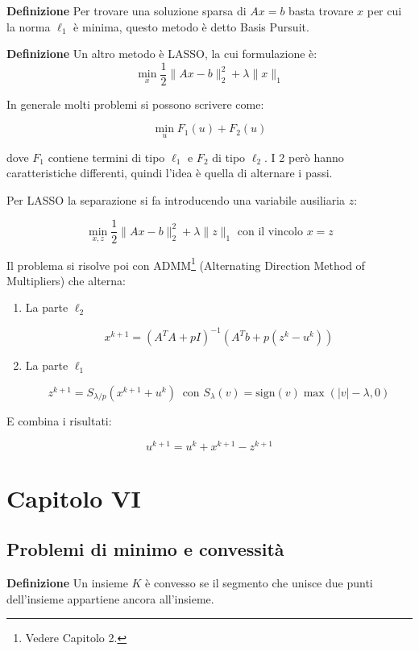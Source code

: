 \documentclass{article}
\newcommand{\df}{\noindent\textbf{Definizione} }
\begin{document}
\df Per trovare una soluzione sparsa di $Ax=b$ basta trovare $x$ per cui la norma $\ell_1$ è minima, questo metodo è detto Basis Pursuit.\newline  

\df Un altro metodo è LASSO, la cui formulazione è: \[ \min_x \frac12\|Ax-b\|_2^2 + \lambda \|x\|_1 \]\newline


In generale molti problemi si possono scrivere come:

\[ \min_u F_1(u)+F_2(u) \] 

dove $F_1$ contiene termini di tipo $\ell_1$ e $F_2$ di tipo $\ell_2$. I 2 però hanno caratteristiche differenti, quindi l'idea è quella di alternare i passi.\newline

Per LASSO la separazione si fa introducendo una variabile ausiliaria $z$:

\[
\min_{x,z} \frac12\|Ax-b\|_2^2+\lambda\|z\|_1\text{ con il vincolo }x=z
\]\newline

Il problema si risolve poi con ADMM\footnote{Vedere Capitolo 2.} (Alternating Direction Method of Multipliers) che alterna:
\begin{enumerate}
    \item La parte $\ell_2$

            \[
            x^{k+1}=(A^TA+pI)^{-1}(A^Tb+p(z^k-u^k))
            \]

    \item La parte $\ell_1$

            \[
            z^{k+1}=S_{\lambda/p}(x^{k+1}+u^k)\ \text{ con }S_\lambda(v)=\mathrm{sign}(v)\max(|v|-\lambda,0)
            \]
    
\end{enumerate}


E combina i risultati:

\[
u^{k+1}=u^k+x^{k+1}-z^{k+1}
\]\newpage

\section{Capitolo VI}

\subsection{Problemi di minimo e convessità}

\df Un insieme $K$ è convesso se il segmento che unisce due punti dell'insieme appartiene ancora all'insieme.\newline
\end{document}
